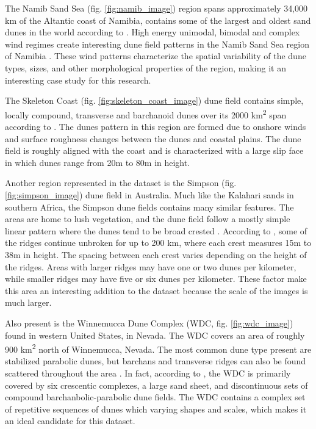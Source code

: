 \documentclass[review]{elsarticle}
\begin{document}
The Namib Sand Sea (fig. \ref{fig:namib_image}) region spans approximately 34,000 km of the Altantic coast of Namibia, contains some of the largest and oldest sand dunes in the world according to \cite{goodie_namib_sand_sea_ancient_desert}. High energy unimodal, bimodal and complex wind regimes create interesting dune field patterns in the Namib Sand Sea region of Namibia \cite{lancaster_winds_sand_movement_namib_sea}. These wind patterns characterize the spatial variability of the dune types, sizes, and other morphological properties of the region, making it an interesting case study for this research.

The Skeleton Coast (fig. \ref{fig:skeleton_coast_image}) dune field contains simple, locally compound, transverse and barchanoid dunes over its 2000 km\textsuperscript{2} span according to \cite{lancaster_dunes_skeleton_coast}. The dunes pattern in this region are formed due to onshore winds and surface roughness changes between the dunes and coastal plains. The dune field is roughly aligned with the coast and is characterized with a large slip face in which dunes range from 20m to 80m in height.

Another region represented in the dataset is the Simpson (fig. \ref{fig:simpson_image}) dune field in Australia. Much like the Kalahari sands in southern Africa, the Simpson dune fields contains many similar features. The areas are home to lush vegetation, and the dune field follow a mostly simple linear pattern where the dunes tend to be broad crested \cite{hesse_australian_desert_dunefields}. According to \cite{twidale_simpson_desert_australia}, some of the ridges continue unbroken for up to 200 km, where each crest measures 15m to 38m in height. The spacing between each crest varies depending on the height of the ridges. Areas with larger ridges may have one or two dunes per kilometer, while smaller ridges may have five or six dunes per kilometer. These factor make this area an interesting addition to the dataset because the scale of the images is much larger.

Also present is the Winnemucca Dune Complex (WDC, fig. \ref{fig:wdc_image}) found in western United States, in Nevada. The WDC covers an area of roughly 900 km\textsuperscript{2} north of Winnemucca, Nevada. The most common dune type present are stabilized parabolic dunes, but barchans and transverse ridges can also be found scattered throughout the area \cite{zimbelman_eolian_deposits_western_united_states}. In fact, according to \cite{pepe_winnemucca_dune_complex}, the WDC is primarily covered by six crescentic complexes, a large sand sheet, and discontinuous sets of compound barchanbolic-parabolic dune fields. The WDC contains a complex set of repetitive sequences of dunes which varying shapes and scales, which makes it an ideal candidate for this dataset.
\end{document}
